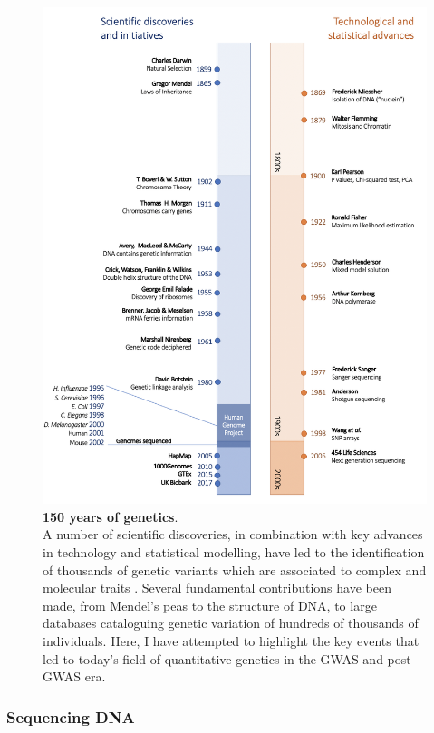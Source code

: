 \begin{figure}[htbp]
\centering
\includegraphics[width=15cm]{Chapter1/Fig/genetic_timeline_draft.png}
\caption[Genetic Timeline]{\textbf{150 years of genetics}.\\
A number of scientific discoveries, in combination with key advances in technology and statistical modelling, have led to the identification of thousands of genetic variants which are associated to complex and molecular traits \cite{nhgri2003genetic}.
Several fundamental contributions have been made, from Mendel's peas to the structure of DNA, to large databases cataloguing genetic variation of hundreds of thousands of individuals.
Here, I have attempted to highlight the key events that led to today's field of quantitative genetics in the GWAS and post-GWAS era.}
\label{fig:genetic_timeline}
\end{figure}

\subsubsection{Sequencing DNA}
\label{sec:dna_seq}

